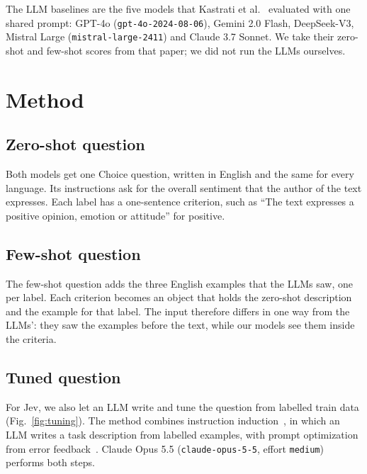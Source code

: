 \documentclass[sigconf]{acmart}
\begin{document}
The LLM baselines are the five models that Kastrati et al.~\cite{kastrati2026language} evaluated with one shared prompt: GPT-4o (\texttt{gpt-4o-2024-08-06}), Gemini 2.0 Flash, DeepSeek-V3, Mistral Large (\texttt{mistral-large-2411}) and Claude 3.7 Sonnet. We take their zero-shot and few-shot scores from that paper; we did not run the LLMs ourselves.

\section{Method}

\subsection{Zero-shot question}
Both models get one Choice question, written in English and the same for every language. Its instructions ask for the overall sentiment that the author of the text expresses. Each label has a one-sentence criterion, such as ``The text expresses a positive opinion, emotion or attitude'' for positive.

\subsection{Few-shot question}
The few-shot question adds the three English examples that the LLMs saw, one per label. Each criterion becomes an object that holds the zero-shot description and the example for that label. The input therefore differs in one way from the LLMs': they saw the examples before the text, while our models see them inside the criteria.

\subsection{Tuned question}
For Jev, we also let an LLM write and tune the question from labelled train data (Fig.~\ref{fig:tuning}). The method combines instruction induction~\cite{honovich2023instruction}, in which an LLM writes a task description from labelled examples, with prompt optimization from error feedback~\cite{pryzant2023protegi}. Claude Opus 5.5 (\texttt{claude-opus-5-5}, effort \texttt{medium}) performs both steps.
\end{document}
